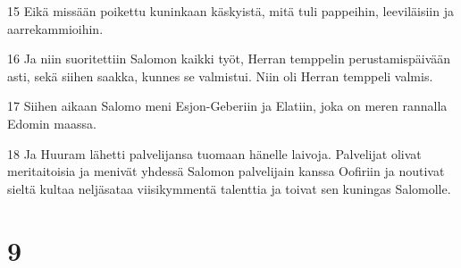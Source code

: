 \par 15 Eikä missään poikettu kuninkaan käskyistä, mitä tuli pappeihin, leeviläisiin ja aarrekammioihin.
\par 16 Ja niin suoritettiin Salomon kaikki työt, Herran temppelin perustamispäivään asti, sekä siihen saakka, kunnes se valmistui. Niin oli Herran temppeli valmis.
\par 17 Siihen aikaan Salomo meni Esjon-Geberiin ja Elatiin, joka on meren rannalla Edomin maassa.
\par 18 Ja Huuram lähetti palvelijansa tuomaan hänelle laivoja. Palvelijat olivat meritaitoisia ja menivät yhdessä Salomon palvelijain kanssa Oofiriin ja noutivat sieltä kultaa neljäsataa viisikymmentä talenttia ja toivat sen kuningas Salomolle.

\chapter{9}

